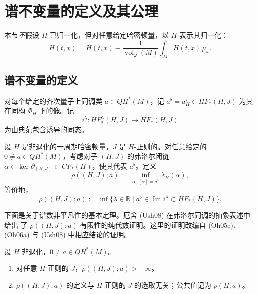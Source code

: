 \section{谱不变量的定义及其公理}
\label{sec:spectral-invariants-definition-axioms}

本节\emph{不}假设 $H$ 已归一化，但对任意给定哈密顿量，以 $\underline H$ 表示其归一化：
\begin{equation}
 \underline H(t,x)=H(t,x)-\frac1{\operatorname{vol}_\omega(M)}
 \int_MH(t,x)\,\mu_\omega.
 \label{eq:21-hamiltonian-normalization}
\end{equation}

\subsection{谱不变量的定义}

对每个给定的齐次量子上同调类 $a\in QH^*(M)$，记
$a^\flat=a_H^\flat\in HF_*(H,J)$ 为其在同构 $\Phi_H$ 下的像。记
\[
 i^\lambda:HF_*^\lambda(H,J)\longrightarrow HF_*(H,J)
\]
为由典范包含诱导的同态。

\begin{definition}
\label{def:21-spectral-invariant}
设 $H$ 是非退化的一周期哈密顿量，$J$ 是 $H$-正则的。对任意给定的
$0\neq a\in QH^*(M)$，考虑对子 $(H,J)$ 的弗洛尔闭链
$\alpha\in\ker\partial_{(H,J)}\subset CF_*(H)$，使其代表 $a^\flat$。定义
\[
 \rho((H,J);a):=\inf_{\alpha;\,[\alpha]=a^\flat}\lambda_H(\alpha),
\]
等价地，
\[
 \rho((H,J);a):=
 \inf\{\lambda\in\mathbb R\mid a^\flat\in\operatorname{Im}i^\lambda
 \subset HF_*(H,J)\}.
\]
\end{definition}

下面是关于谱数非平凡性的基本定理。厄舍 (Ush08) 在弗洛尔同调的抽象表述中给出
了 $\rho((H,J);a)$ 有限性的纯代数证明。这里的证明改编自 (Oh05c)、(Oh06a) 与
(Ush08) 中相应结论的证明。

\begin{theorem}
\label{thm:21-spectral-invariant-finite-independent}
设 $H$ 非退化，$0\neq a\in QH^*(M)$。
\begin{enumerate}[label=(\arabic*)]
 \item 对任意 $H$-正则的 $J$，$\rho((H,J);a)>-\infty$。
 \item $\rho((H,J);a)$ 的定义与 $H$-正则的 $J$ 的选取无关；公共值记为
 $\rho(H;a)$。
\end{enumerate}
\end{theorem}

